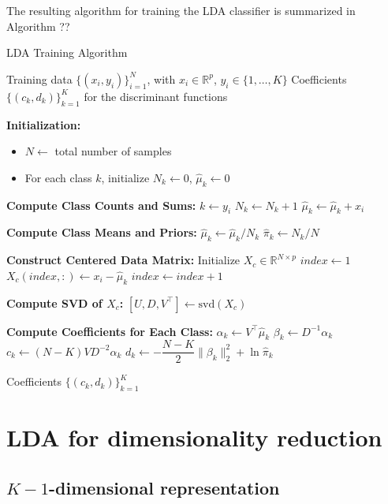 \documentclass[a4paper,12pt]{article}
\begin{document}
The resulting algorithm for training the LDA classifier is summarized in Algorithm ??

\begin{algorithm}[htbp]
\caption{LDA Training Algorithm}
\begin{algorithmic}[1]
\REQUIRE Training data $\{(x_i, y_i)\}_{i=1}^N$, with $x_i \in \mathbb{R}^p$, $y_i \in \{1,\ldots,K\}$
\ENSURE Coefficients $\{ (c_k, d_k) \}_{k=1}^K$ for the discriminant functions

\STATE \textbf{Initialization:}
\begin{itemize}
    \item $N \gets$ total number of samples
    \item For each class $k$, initialize $N_k \gets 0$, $\hat{\mu}_k \gets 0$
\end{itemize}

\STATE \textbf{Compute Class Counts and Sums:}
    \STATE $k \gets y_i$
    \STATE $N_k \gets N_k + 1$
    \STATE $\hat{\mu}_k \gets \hat{\mu}_k + x_i$
\ENDFOR

\STATE \textbf{Compute Class Means and Priors:}
    \STATE $\hat{\mu}_k \gets \hat{\mu}_k / N_k$
    \STATE $\hat{\pi}_k \gets N_k / N$
\ENDFOR  %

\STATE \textbf{Construct Centered Data Matrix:}
\STATE Initialize $X_c \in \mathbb{R}^{N \times p}$
\STATE $index \gets 1$
        \STATE $X_c(index, :) \gets x_i - \hat{\mu}_k$
        \STATE $index \gets index + 1$
    \ENDFOR
\ENDFOR

\STATE \textbf{Compute SVD of $X_c$:}
\STATE $[U, D, V^\top] \gets \text{svd}(X_c)$

\STATE \textbf{Compute Coefficients for Each Class:}
    \STATE $\alpha_k \gets V^\top \hat{\mu}_k$
    \STATE $\beta_k \gets D^{-1} \alpha_k$
    \STATE $c_k \gets (N - K) V D^{-2} \alpha_k$
    \STATE $d_k \gets -\dfrac{N - K}{2} \| \beta_k \|_2^2 + \ln \hat{\pi}_k$
\ENDFOR

\RETURN Coefficients $\{ (c_k, d_k) \}_{k=1}^K$
\end{algorithmic}
\end{algorithm}

\section{LDA for dimensionality reduction}

\subsection{$K-1$-dimensional representation}
\end{document}
